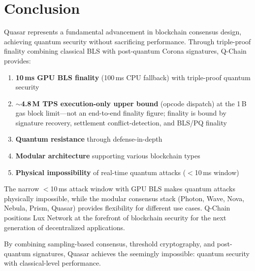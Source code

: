 \section{Conclusion}


Quasar represents a fundamental advancement in blockchain consensus design, achieving quantum security without sacrificing performance. Through triple-proof finality combining classical BLS with post-quantum Corona signatures, Q-Chain provides:

\begin{enumerate}
\item \textbf{10\,ms GPU BLS finality} (100\,ms CPU fallback) with triple-proof quantum security
\item \textbf{$\sim$4.8\,M TPS execution-only upper bound} (opcode dispatch) at the 1\,B gas block limit---not an end-to-end finality figure; finality is bound by signature recovery, settlement conflict-detection, and BLS/PQ finality
\item \textbf{Quantum resistance} through defense-in-depth
\item \textbf{Modular architecture} supporting various blockchain types
\item \textbf{Physical impossibility} of real-time quantum attacks ($<$10\,ms window)
\end{enumerate}

The narrow $<$10\,ms attack window with GPU BLS makes quantum attacks physically impossible, while the modular consensus stack (Photon, Wave, Nova, Nebula, Prism, Quasar) provides flexibility for different use cases. Q-Chain positions Lux Network at the forefront of blockchain security for the next generation of decentralized applications.

By combining sampling-based consensus, threshold cryptography, and post-quantum signatures, Quasar achieves the seemingly impossible: quantum security with classical-level performance.

